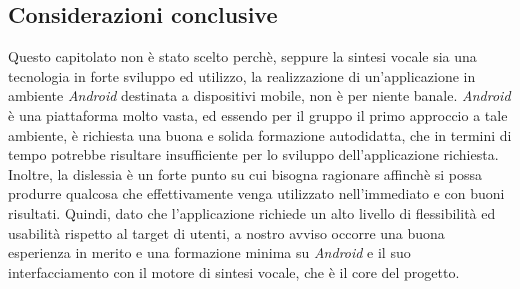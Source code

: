 \subsection{Considerazioni conclusive}

Questo capitolato non è stato scelto perchè, seppure
la sintesi vocale sia una tecnologia in forte sviluppo ed utilizzo, la realizzazione di un'applicazione in ambiente \textit{Android} destinata
a dispositivi mobile, non è per niente banale. \textit{Android} è una piattaforma
molto vasta, ed essendo per il gruppo il primo approccio a tale ambiente, è richiesta una buona e solida formazione autodidatta, che in termini di tempo potrebbe risultare insufficiente per lo sviluppo dell'applicazione richiesta. Inoltre, la dislessia è un forte punto su cui bisogna ragionare affinchè si possa produrre qualcosa che effettivamente venga utilizzato
nell'immediato e con buoni risultati. Quindi, dato che l'applicazione richiede un alto livello di flessibilità ed usabilità rispetto al target di utenti, a nostro avviso occorre una buona esperienza in merito e una formazione minima su \textit{Android} e il suo interfacciamento con il motore di sintesi vocale, che è il core del progetto.